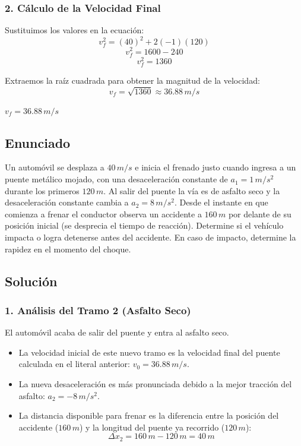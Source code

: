 \documentclass[12pt, a4paper]{article}
\begin{document}
\subsubsection*{2. Cálculo de la Velocidad Final}
Sustituimos los valores en la ecuación:
$$ v_f^2 = (40)^2 + 2(-1)(120) $$
$$ v_f^2 = 1600 - 240 $$
$$ v_f^2 = 1360 $$

Extraemos la raíz cuadrada para obtener la magnitud de la velocidad:
$$ v_f = \sqrt{1360} \approx 36.88 \, \si{m/s} $$

\begin{tcolorbox}[colback=green!5!white, colframe=green!50!black, title=Respuesta Final]
\centering \Large $v_f = 36.88 \, \si{m/s}$
\end{tcolorbox}

\newpage

\subsection*{Enunciado}
Un automóvil se desplaza a $40 \, \si{m/s}$ e inicia el frenado justo cuando ingresa a un puente metálico mojado, con una desaceleración constante de $a_1 = 1 \, \si{m/s^2}$ durante los primeros $120 \, \si{m}$. Al salir del puente la vía es de asfalto seco y la desaceleración constante cambia a $a_2 = 8 \, \si{m/s^2}$. Desde el instante en que comienza a frenar el conductor observa un accidente a $160 \, \si{m}$ por delante de su posición inicial (se desprecia el tiempo de reacción). Determine si el vehículo impacta o logra detenerse antes del accidente. En caso de impacto, determine la rapidez en el momento del choque.

\subsection*{Solución}

\subsubsection*{1. Análisis del Tramo 2 (Asfalto Seco)}
El automóvil acaba de salir del puente y entra al asfalto seco.
\begin{itemize}
    \item La velocidad inicial de este nuevo tramo es la velocidad final del puente calculada en el literal anterior: $v_0 = 36.88 \, \si{m/s}$.
    \item La nueva desaceleración es más pronunciada debido a la mejor tracción del asfalto: $a_2 = -8 \, \si{m/s^2}$.
    \item La distancia disponible para frenar es la diferencia entre la posición del accidente ($160 \, \si{m}$) y la longitud del puente ya recorrido ($120 \, \si{m}$):
    $$ \Delta x_2 = 160 \, \si{m} - 120 \, \si{m} = 40 \, \si{m} $$
\end{itemize}
\end{document}
